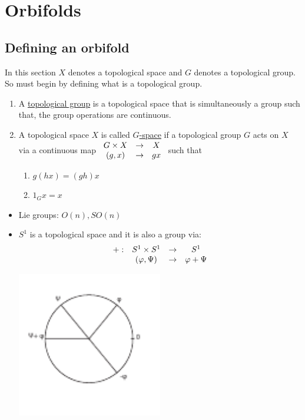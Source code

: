 \chapter{Orbifolds}


\section{Defining an orbifold}

In this section $X$ denotes a topological space and $G$ denotes a topological group. So must begin by defining what is a topological group.\\

\begin{defn}

\begin{enumerate}
\item A \underline{topological group} is a topological space that is simultaneously a group such that, the group operations are continuous.
\item A topological space $X$ is called \underline{$G$-space} if a topological group $G$ acts on $X$ via a continuous map $\begin{array}[c]{ccc}
 G\times X&\rightarrow &X\\
(g,x)&{\rightarrow}& gx
\end{array}$ such that
\begin{enumerate}
  \item  $g(hx)=(gh)x$
  \item $1_Gx=x$
\end{enumerate}
\end{enumerate}
\end{defn}

\begin{example}

\begin{itemize}
  \item Lie groups: $O(n), SO(n)$
  \item $S^1$ is a topological space and it is also a group via:
  $$\begin{array}[c]{cccc}
 +: &S^1\times S^1&{\rightarrow}&S^1\\
&(\varphi,\Psi)&{\rightarrow}& \varphi +\Psi
\end{array}$$
\begin{center}
\includegraphics[width=0.5\textwidth]{./suma}
\end{center}
\end{itemize}

\end{example}

